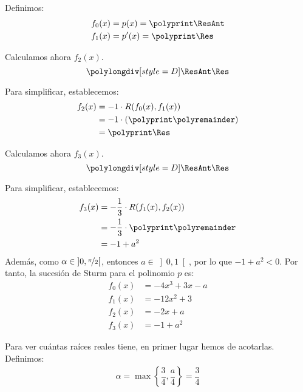 \begin{ejercicio}[DGIIM 2023/2024]
\begin{enumerate}
        Definimos:
        \polymul{}
        \polymul{}
        \begin{align*}
            f_0(x) &= p(x)=\polyprint\ResAnt\\
            f_1(x) &= p'(x)=\polyprint\Res
        \end{align*}

        Calculamos ahora $f_2(x)$.
        \begin{equation*}
            \polylongdiv[style=D]\ResAnt\Res
        \end{equation*}
        \polydiv\div\ResAnt\Res
        \polymul\ResAnt{}
        \polymul\Res{}

        Para simplificar, establecemos:
        \begin{align*}
            f_2(x) &= -1\cdot R(f_0(x), f_1(x))\\
            &= -1\cdot \left(\polyprint\polyremainder\right)\\
            &= \polyprint\Res
        \end{align*}

        Calculamos ahora $f_3(x)$.
        \begin{equation*}
            \polylongdiv[style=D]\ResAnt\Res
        \end{equation*}
        \polydiv\div\ResAnt\Res
        \polymul\ResAnt{}
        \polymul\Res{}

        Para simplificar, establecemos:
        \begin{align*}
            f_3(x) &= -\frac{1}{3}\cdot R(f_1(x), f_2(x))\\
            &= -\frac{1}{3}\cdot \polyprint\polyremainder\\
            &= -1+a^2
        \end{align*}
        Además, como $\alpha\in \left]0,\nicefrac{\pi}{2}\right[$, entonces $a\in \left]0, 1\right[$, por lo que $-1+a^2<0$. Por tanto, la sucesión de Sturm para el polinomio $p$ es:
        \begin{align*}
            f_0(x) &= -4x^3 + 3x - a\\
            f_1(x) &= -12x^2 + 3\\
            f_2(x) &= -2x+a\\
            f_3(x) &= -1+a^2
        \end{align*}

        Para ver cuántas raíces reales tiene, en primer lugar hemos de acotarlas. Definimos:
        \begin{align*}
            \alpha=\max\left\{\dfrac{3}{4},\dfrac{a}{4}\right\}=\dfrac{3}{4}
        \end{align*}
        

\end{enumerate}
\end{ejercicio}
